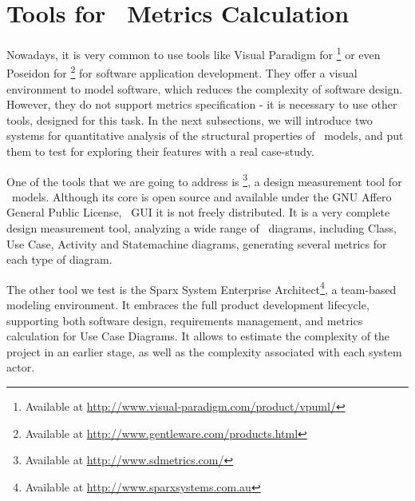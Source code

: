 \section{Tools for \uml\ Metrics Calculation} \label{tools}

Nowadays, it is very common to use tools like \textsf{Visual Paradigm for \uml\footnote{Available at \url{http://www.visual-paradigm.com/product/vpuml/}}} or even \textsf{Poseidon for \uml}\footnote{Available at \url{http://www.gentleware.com/products.html}} for software application development.
They offer a visual environment to model software, which reduces the complexity of software design.
However, they do not support metrics specification - it is necessary to use other tools, designed for this task.
In the next subsections, we will introduce two systems for quantitative analysis of the structural properties of \uml\ models, and put them to test for exploring their features with a real case-study.

One of the tools that we are going to address is \sdmetrics\footnote{Available at \url{http://www.sdmetrics.com/}}, a design measurement tool for \uml\ models.
Although its core is open source and available under the GNU Affero General Public License, \sdmetrics\ GUI it is not freely distributed. 
It is a very complete design measurement tool, analyzing a wide range of \uml\ diagrams, including Class, Use Case, Activity and Statemachine diagrams, generating several metrics for each type of diagram.

The other tool we test is the \textsf{Sparx System Enterprise Architect}{\footnote{Available at \url{http://www.sparxsystems.com.au}}}, a team-based modeling environment. 
It embraces the full product development lifecycle, supporting both software design, requirements management, and metrics calculation for Use Case Diagrams.
It allows to estimate the complexity of the project in an earlier stage, as well as the complexity associated with each system actor.
